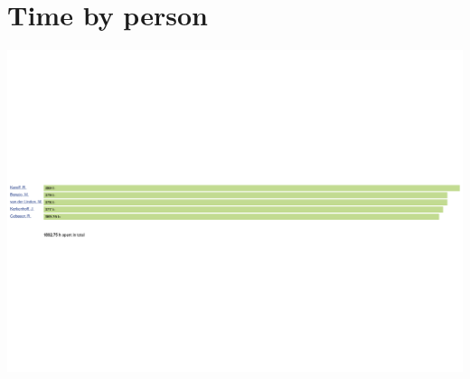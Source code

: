 \documentclass[12pt]{article}
\begin{document}
	\section{Time by person}
		\hspace*{0.20\paperheight}
		\includegraphics[width=1.25\textwidth,angle=90]{timebyperson}
		\clearpage
\end{document}
